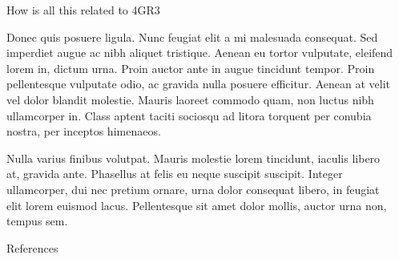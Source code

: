 \documentclass[final]{beamer}
\newlength{\sepwidth}
\newlength{\colwidth}
\newcommand{\separatorcolumn}{\begin{column}{\sepwidth}\end{column}}
\begin{document}
\begin{frame}[t]
\begin{columns}[t]
\begin{column}{\colwidth}
\begin{block}{How is all this related to 4GR3}

    Donec quis posuere ligula. Nunc feugiat elit a mi malesuada consequat. Sed
    imperdiet augue ac nibh aliquet tristique. Aenean eu tortor vulputate,
    eleifend lorem in, dictum urna. Proin auctor ante in augue tincidunt
    tempor. Proin pellentesque vulputate odio, ac gravida nulla posuere
    efficitur. Aenean at velit vel dolor blandit molestie. Mauris laoreet
    commodo quam, non luctus nibh ullamcorper in. Class aptent taciti sociosqu
    ad litora torquent per conubia nostra, per inceptos himenaeos.

    Nulla varius finibus volutpat. Mauris molestie lorem tincidunt, iaculis
    libero at, gravida ante. Phasellus at felis eu neque suscipit suscipit.
    Integer ullamcorper, dui nec pretium ornare, urna dolor consequat libero,
    in feugiat elit lorem euismod lacus. Pellentesque sit amet dolor mollis,
    auctor urna non, tempus sem.

  \end{block}

  \begin{block}{References}

    \nocite{*}
    \footnotesize{}

  \end{block}

\end{column}

\separatorcolumn
\end{columns}
\end{frame}
\end{document}

